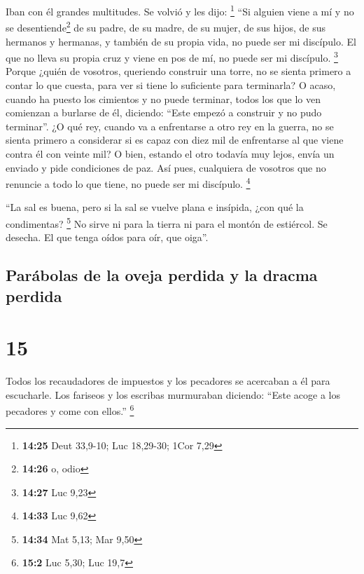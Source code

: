  Iban con él grandes multitudes. Se volvió y les dijo:
\footnote{\textbf{14:25} Deut 33,9-10; Luc 18,29-30; 1Cor 7,29}
 ``Si alguien viene a mí y no se desentiende\footnote{\textbf{14:26}
  o, odio} de su padre, de su madre, de su mujer, de sus hijos, de sus
hermanos y hermanas, y también de su propia vida, no puede ser mi
discípulo.  El que no lleva su propia cruz y viene en pos
de mí, no puede ser mi discípulo. \footnote{\textbf{14:27} Luc 9,23}
 Porque ¿quién de vosotros, queriendo construir una
torre, no se sienta primero a contar lo que cuesta, para ver si tiene lo
suficiente para terminarla?  O acaso, cuando ha puesto
los cimientos y no puede terminar, todos los que lo ven comienzan a
burlarse de él,  diciendo: ``Este empezó a construir y no
pudo terminar''.  ¿O qué rey, cuando va a enfrentarse a
otro rey en la guerra, no se sienta primero a considerar si es capaz con
diez mil de enfrentarse al que viene contra él con veinte mil?
 O bien, estando el otro todavía muy lejos, envía un
enviado y pide condiciones de paz.  Así pues, cualquiera
de vosotros que no renuncie a todo lo que tiene, no puede ser mi
discípulo. \footnote{\textbf{14:33} Luc 9,62}

 ``La sal es buena, pero si la sal se vuelve plana e
insípida, ¿con qué la condimentas? \footnote{\textbf{14:34} Mat 5,13;
  Mar 9,50}  No sirve ni para la tierra ni para el montón
de estiércol. Se desecha. El que tenga oídos para oír, que oiga''.

\hypertarget{paruxe1bolas-de-la-oveja-perdida-y-la-dracma-perdida}{%
\subsection{Parábolas de la oveja perdida y la dracma
perdida}\label{paruxe1bolas-de-la-oveja-perdida-y-la-dracma-perdida}}

\hypertarget{section-14}{%
\section{15}\label{section-14}}

 Todos los recaudadores de impuestos y los pecadores se
acercaban a él para escucharle.  Los fariseos y los
escribas murmuraban diciendo: ``Este acoge a los pecadores y come con
ellos.'' \footnote{\textbf{15:2} Luc 5,30; Luc 19,7}


